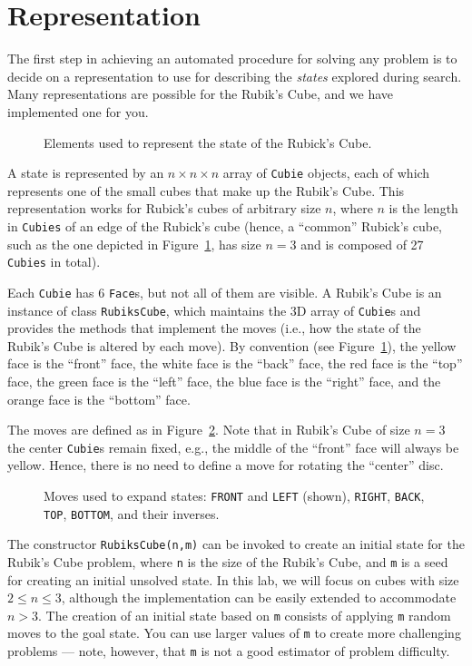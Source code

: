 \documentclass[a4paper]{article}
\begin{document}
\section{Representation}
The first step in achieving an automated procedure for solving any problem is to decide on a representation to use for describing the {\em states} explored during search.  Many representations are possible for the Rubik's Cube, and we have implemented one for you.

\begin{figure}[!ht]
\centering

\caption{{\small Elements used to represent the state of the Rubick's Cube.}}
\label{fig:rcState}
\end{figure}

A state is represented by an $n \times n \times n$ array of {\tt Cubie} objects, each of which represents one of the small cubes that make up the Rubik's Cube. This representation works for Rubick's cubes of arbitrary size $n$, where $n$ is the length in {\tt Cubies} of an edge of the Rubick's cube (hence, a ``common'' Rubick's cube, such as the one depicted in Figure~\ref{fig:rcState}, has size $n = 3$ and is composed of 27 {\tt Cubies} in total).

Each {\tt Cubie} has 6 {\tt Face}s, but not all of them are visible.  A Rubik's Cube is an instance of class {\tt RubiksCube}, which maintains the 3D array of {\tt Cubie}s and provides the methods that implement the moves (i.e., how the state of the Rubik's Cube is altered by each move).  By convention (see Figure~\ref{fig:rcState}), the yellow face is the ``front'' face, the white face is the ``back'' face, the red face is the ``top'' face, the green face is the ``left'' face, the blue face is the ``right'' face, and the orange face is the ``bottom'' face.  

The moves are defined as in Figure~\ref{fig:rcMoves}.  Note that in Rubik's Cube of size $n = 3$ the center {\tt Cubie}s remain fixed, e.g., the middle of the ``front'' face will always be yellow. Hence, there is no need to define a move for rotating the ``center'' disc.

\begin{figure}[!ht]
\centering

\caption{{\small Moves used to expand states: {\tt FRONT} and {\tt LEFT} (shown), {\tt RIGHT}, {\tt BACK}, {\tt TOP}, {\tt BOTTOM}, and their inverses.}}
\label{fig:rcMoves}
\end{figure}

The constructor {\tt RubiksCube(n,m)} can be invoked to create an initial state for the Rubik's Cube problem, where {\tt n} is the size of the Rubik's Cube, and {\tt m} is a seed for creating an initial unsolved state. In this lab, we will focus on cubes with size $2 \leq n \leq 3$, although the implementation can be easily extended to accommodate $n > 3$.  The creation of an initial state based on {\tt m} consists of applying {\tt m} random moves to the goal state.  You can use larger values of {\tt m} to create more challenging problems --- note, however, that {\tt m} is not a good estimator of problem difficulty.
\end{document}
